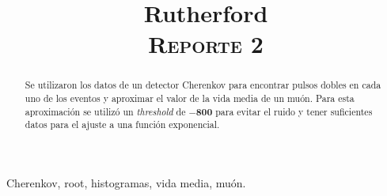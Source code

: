 \documentclass[conference]{IEEEtran}
\begin{document}
\title{Rutherford \\
{\footnotesize \scshape{Reporte 2}}
}

\author{
}



\maketitle

\begin{abstract}
    Se utilizaron los datos de un detector Cherenkov para encontrar pulsos dobles en cada uno de los eventos y aproximar el valor de la vida media de un muón. Para esta aproximación se utilizó un \textit{threshold} de $\mathbf{-800}$ para evitar el ruido y tener suficientes datos para el ajuste a una función exponencial.
\end{abstract}

\begin{IEEEkeywords}
	Cherenkov, root, histogramas, vida media, muón.
\end{IEEEkeywords}

%
    
\end{document}
